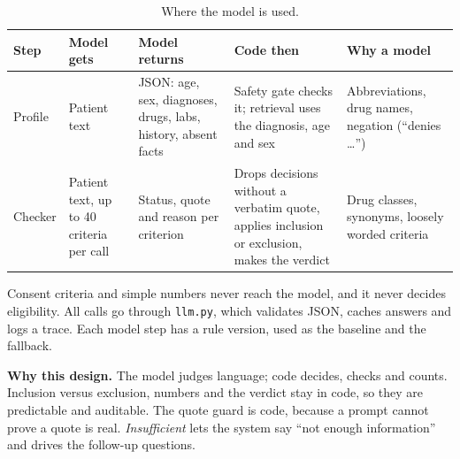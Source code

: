 \documentclass[11pt,a4paper]{article}
\begin{document}
\begin{table}[!htb]
\centering
\small
\begin{tabular}{>{\raggedright\arraybackslash}p{1.6cm}>{\raggedright\arraybackslash}p{2.4cm}>{\raggedright\arraybackslash}p{2.9cm}>{\raggedright\arraybackslash}p{3.6cm}>{\raggedright\arraybackslash}p{3.3cm}}
\toprule
Step & Model gets & Model returns & Code then & Why a model \\
\midrule
1 Profile & Patient text & JSON: age, sex, diagnoses, drugs, labs, history, absent facts & Safety gate checks it; retrieval uses the diagnosis, age and sex & Abbreviations, drug names, negation (``denies \ldots'') \\
4 Checker & Patient text, up to 40 criteria per call & Status, quote and reason per criterion & Drops decisions without a verbatim quote, applies inclusion or exclusion, makes the verdict & Drug classes, synonyms, loosely worded criteria \\
\bottomrule
\end{tabular}
\caption{Where the model is used.}
\end{table}

Consent criteria and simple numbers never reach the model, and it never decides eligibility. All calls go through \texttt{llm.py}, which validates JSON, caches answers and logs a trace. Each model step has a rule version, used as the baseline and the fallback.

\textbf{Why this design.} The model judges language; code decides, checks and counts. Inclusion versus exclusion, numbers and the verdict stay in code, so they are predictable and auditable. The quote guard is code, because a prompt cannot prove a quote is real. \emph{Insufficient} lets the system say ``not enough information'' and drives the follow-up questions.
\end{document}
